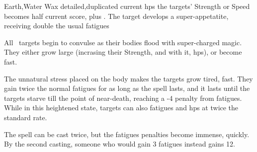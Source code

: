   {Earth,Water}%
  {Wax}%
  {detailed,duplicated}%
  {current \glspl{hp}}%
  {the targets' Strength or Speed becomes half current score, plus . The target develops a super-appetatite, receiving double the usual \glspl{fatigue}}%
  {
    All \spellArea\ targets begin to convulse as their bodies flood with super-charged magic.
    They either grow large (incrasing their Strength, and with it, \glspl{hp}), or become fast.

    The unnatural stress placed on the body makes the targets grow tired, fast.
    They gain twice the normal \glspl{fatigue} for as long as the spell lasts, and it lasts until the targets starve till the point of near-death, reaching a -4 penalty from \glspl{fatigue}.
    While in this heightened state, targets can also \glspl{fatigue} and \glspl{hp} at twice the standard rate.

    The spell can be cast twice, but the \glspl{fatigue} penalties become immense, quickly.
    By the second casting, someone who would gain 3 \glspl{fatigue} instead gains 12.
  }

